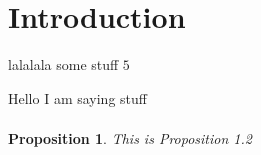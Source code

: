 \documentclass[12pt]{amsart}
\numberwithin{equation}{section}
\numberwithin{figure}{section}
\newtheorem{prop}[equation]{Proposition}
\begin{document}
\section{Introduction}
lalalala some stuff $5$

Hello I am saying stuff
\begin{eqnarray}
\end{eqnarray}
\begin{prop}
This is Proposition 1.2
\end{prop}
\end{document}
